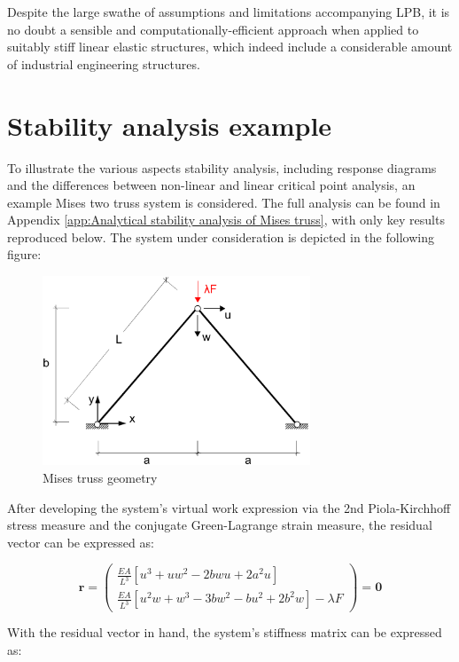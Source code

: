  Despite the large swathe of assumptions and limitations accompanying LPB, it is no doubt a sensible and computationally-efficient approach when applied to suitably stiff linear elastic structures, which indeed include a considerable amount of industrial engineering structures.

\section{Stability analysis example}

To illustrate the various aspects stability analysis, including response diagrams and the differences between non-linear and linear critical point analysis, an example Mises two truss system is considered. The full analysis can be found in Appendix \ref{app:Analytical stability analysis of Mises truss}, with only key results reproduced below. The system under consideration is depicted in the following figure:

\begin{figure}[H]
	\centering
	\def\svgwidth{\columnwidth}
	\includegraphics[width=8cm]{images/mises_truss_def.png}
	\caption{Mises truss geometry}
	\label{stab2_1}
\end{figure}

After developing the system's virtual work expression via the 2nd Piola-Kirchhoff stress measure and the conjugate Green-Lagrange strain measure, the residual vector can be expressed as:

\begin{equation} 
\mathbf{r} = 
\begin{pmatrix}
\frac{EA}{L^3} [u^3+uw^2-2bwu+2a^2u] \\
\frac{EA}{L^3} [u^2w + w^3 - 3bw^2 - bu^2 +2b^2w] - \lambda F
\end{pmatrix}
=
\mathbf{0}
\label{eqstab6}
\end{equation}

With the residual vector in hand, the system's stiffness matrix can be expressed as:

